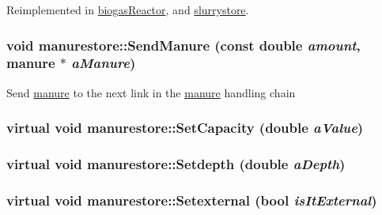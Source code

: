 Reimplemented in \hyperlink{classbiogas_reactor_a479439eabed31849643a005f9f6eb66d}{biogasReactor}, and \hyperlink{classslurrystore_a72711544587a5024eeaa072c43a4840a}{slurrystore}.\hypertarget{classmanurestore_a806191a8259f6b81782af3fe3cb0301f}{
\subsubsection[{SendManure}]{\setlength{\rightskip}{0pt plus 5cm}void manurestore::SendManure (const double {\em amount}, \/  {\bf manure} $\ast$ {\em aManure})}}
\label{classmanurestore_a806191a8259f6b81782af3fe3cb0301f}
Send \hyperlink{classmanure}{manure} to the next link in the \hyperlink{classmanure}{manure} handling chain \hypertarget{classmanurestore_a0fb30db9d2c496a9234c53a1109c9415}{
\subsubsection[{SetCapacity}]{\setlength{\rightskip}{0pt plus 5cm}virtual void manurestore::SetCapacity (double {\em aValue})}}
\label{classmanurestore_a0fb30db9d2c496a9234c53a1109c9415}
\hypertarget{classmanurestore_a30eae0570a0fe584f7a4f395d96d0899}{
\subsubsection[{Setdepth}]{\setlength{\rightskip}{0pt plus 5cm}virtual void manurestore::Setdepth (double {\em aDepth})}}
\label{classmanurestore_a30eae0570a0fe584f7a4f395d96d0899}
\hypertarget{classmanurestore_abffbe2e19e1d1ad114f35c532acc3f4c}{
\subsubsection[{Setexternal}]{\setlength{\rightskip}{0pt plus 5cm}virtual void manurestore::Setexternal (bool {\em isItExternal})}}

